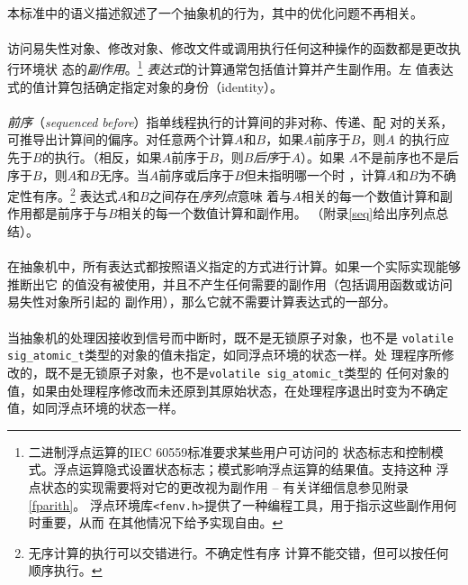 \paragraph{}
本标准中的语义描述叙述了一个抽象机的行为，其中的优化问题不再相关。

\paragraph{}
访问易失性对象、修改对象、修改文件或调用执行任何这种操作的函数都是更改执行环境状
态的\textit{副作用}。\footnote{二进制浮点运算的IEC 60559标准要求某些用户可访问的
状态标志和控制模式。浮点运算隐式设置状态标志；模式影响浮点运算的结果值。支持这种
浮点状态的实现需要将对它的更改视为副作用 -- 有关详细信息参见附录\ref{fparith}。
浮点环境库\texttt{<fenv.h>}提供了一种编程工具，用于指示这些副作用何时重要，从而
在其他情况下给予实现自由。} \textit{表达式}的计算通常包括值计算并产生副作用。左
值表达式的值计算包括确定指定对象的身份（identity）。

\paragraph{}
\textit{前序}（\textit{sequenced before}）指单线程执行的计算间的非对称、传递、配
对的关系，可推导出计算间的偏序。对任意两个计算$A$和$B$，如果$A$前序于$B$，则$A$
的执行应先于$B$的执行。（相反，如果$A$前序于$B$，则$B$\textit{后序}于$A$）。如果
$A$不是前序也不是后序于$B$，则$A$和$B$无序。当$A$前序或后序于$B$但未指明哪一个时
，计算$A$和$B$为不确定性有序。\footnote{无序计算的执行可以交错进行。不确定性有序
计算不能交错，但可以按任何顺序执行。} 表达式$A$和$B$之间存在\textit{序列点}意味
着与$A$相关的每一个数值计算和副作用都是前序于与$B$相关的每一个数值计算和副作用。
（附录\ref{seq}给出序列点总结）。

\paragraph{}
在抽象机中，所有表达式都按照语义指定的方式进行计算。如果一个实际实现能够推断出它
的值没有被使用，并且不产生任何需要的副作用（包括调用函数或访问易失性对象所引起的
副作用），那么它就不需要计算表达式的一部分。

\paragraph{}
当抽象机的处理因接收到信号而中断时，既不是无锁原子对象，也不是
\texttt{volatile sig\_atomic\_t}类型的对象的值未指定，如同浮点环境的状态一样。处
理程序所修改的，既不是无锁原子对象，也不是\texttt{volatile sig\_atomic\_t}类型的
任何对象的值，如果由处理程序修改而未还原到其原始状态，在处理程序退出时变为不确定
值，如同浮点环境的状态一样。

